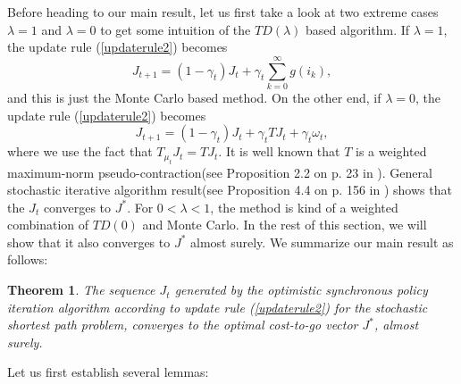 \documentclass[12pt,a4paper]{amsart}
\numberwithin{equation}{section}
\theoremstyle{plain}
\newtheorem{Th}{Theorem}[section]
\theoremstyle{definition}
\begin{document}
Before heading to our main result, let us first take a look at two extreme cases $\lambda = 1$ and $\lambda = 0$ to get some intuition of the $TD(\lambda)$ based algorithm. If $\lambda = 1$, the update rule (\ref{updaterule2}) becomes
$$
J_{t+1} = (1-\gamma_t) J_t + \gamma_t \sum_{k=0}^{\infty} g(i_k),
$$
and this is just the Monte Carlo based method. On the other end, if $\lambda = 0$, the update rule (\ref{updaterule2}) becomes
$$
J_{t+1} = (1-\gamma_t) J_t + \gamma_t TJ_t + \gamma_t \omega_t,
$$
where we use the fact that $T_{\mu_t} J_t = TJ_t$. It is well known that $T$ is a weighted maximum-norm pseudo-contraction(see Proposition 2.2 on p. 23 in \cite{BertsekasTsitsiklis96}). General stochastic iterative algorithm result(see Proposition 4.4 on p. 156 in \cite{BertsekasTsitsiklis96}) shows that the $J_t$ converges to $J^{*}$. For $ 0 < \lambda < 1$, the method is kind of a weighted combination of $TD(0)$ and Monte Carlo. In the rest of this section, we will show that it also converges to $J^{*}$ almost surely. We summarize our main result as follows:

\begin{Th}\label{main2}
	The sequence $J_t$ generated by the optimistic synchronous policy iteration algorithm according to update rule (\ref{updaterule2}) for the  stochastic shortest path problem,  converges to the optimal cost-to-go vector $J^*$, almost surely. 
\end{Th}

Let us first establish several lemmas:
\end{document}
